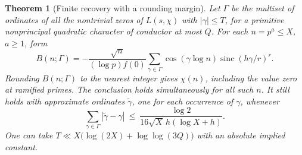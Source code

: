 \documentclass[11pt,letterpaper]{article}
\newtheorem{theorem}{Theorem}[section]
\theoremstyle{remark}\newtheorem{remark}[theorem]{Remark}
\begin{document}
\begin{theorem}[Finite recovery with a rounding margin]\label{thm:decode}
Let $\Gamma$ be the multiset of ordinates of all the nontrivial zeros of $L(s,\chi)$ with $|\gamma|\le T$, for a primitive nonprincipal quadratic character of conductor at most $Q$. For each $n=p^a\le X$, $a\ge1$, form
\begin{equation}\label{eq:finite}
  B(n;\Gamma)=-\frac{\sqrt n}{(\log p)f(0)}
       \sum_{\gamma\in\Gamma}\cos(\gamma\log n)
                      \operatorname{sinc}(h\gamma/r)^r.
\end{equation}
Rounding $B(n;\Gamma)$ to the nearest integer gives $\chi(n)$, including the value zero at ramified primes. The conclusion holds simultaneously for all such $n$. It still holds with approximate ordinates $\widetilde\gamma$, one for each occurrence of $\gamma$, whenever
\begin{equation}\label{eq:perturb}
 \sum_{\gamma\in\Gamma}|\widetilde\gamma-\gamma|
 \ \le\ \frac{\log 2}{16\sqrt X\,h(\log X+h)} .
\end{equation}
One can take $T\ll X\bigl(\log(2X)+\log\log(3Q)\bigr)$ with an absolute implied constant.
\end{theorem}
\end{document}
